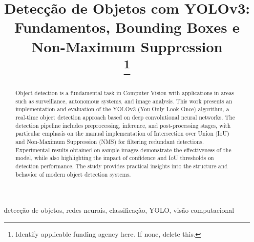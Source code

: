 \documentclass[conference]{IEEEtran}
\begin{document}
\title{Detecção de Objetos com YOLOv3: Fundamentos, Bounding Boxes e Non-Maximum Suppression\\

\thanks{Identify applicable funding agency here. If none, delete this.}
}

\author{
\and
{}
\and
{}
}

\maketitle

\begin{abstract}
Object detection is a fundamental task in Computer Vision with applications in areas such as surveillance, autonomous systems, and image analysis. This work presents an implementation and evaluation of the YOLOv3 (You Only Look Once) algorithm, a real-time object detection approach based on deep convolutional neural networks. The detection pipeline includes preprocessing, inference, and post-processing stages, with particular emphasis on the manual implementation of Intersection over Union (IoU) and Non-Maximum Suppression (NMS) for filtering redundant detections. Experimental results obtained on sample images demonstrate the effectiveness of the model, while also highlighting the impact of confidence and IoU thresholds on detection performance. The study provides practical insights into the structure and behavior of modern object detection systems.
\end{abstract}

\begin{IEEEkeywords}
detecção de objetos, redes neurais, classificação, YOLO, visão computacional
\end{IEEEkeywords}
\end{document}
